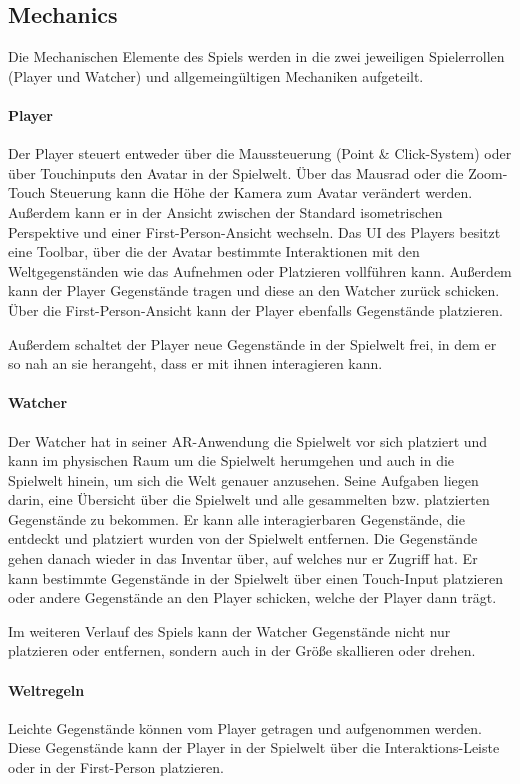 \subsection{Mechanics}
Die Mechanischen Elemente des Spiels werden in die zwei jeweiligen Spielerrollen (Player und Watcher) und allgemeingültigen Mechaniken aufgeteilt.

\paragraph{Player}
Der Player steuert entweder über die Maussteuerung (Point \& Click-System) oder über Touchinputs den Avatar in der Spielwelt. Über das Mausrad oder die Zoom-Touch Steuerung kann die Höhe der Kamera zum Avatar verändert werden. Außerdem kann er in der Ansicht zwischen der Standard isometrischen Perspektive und einer First-Person-Ansicht wechseln. Das \ac{UI} des Players besitzt eine Toolbar, über die der Avatar bestimmte Interaktionen mit den Weltgegenständen wie das Aufnehmen oder Platzieren vollführen kann. Außerdem kann der Player Gegenstände tragen und diese an den Watcher zurück schicken. Über die First-Person-Ansicht kann der Player ebenfalls Gegenstände platzieren.

Außerdem schaltet der Player neue Gegenstände in der Spielwelt frei, in dem er so nah an sie herangeht, dass er mit ihnen interagieren kann.

\paragraph{Watcher}
Der Watcher hat in seiner \ac{AR}-Anwendung die Spielwelt vor sich platziert und kann im physischen Raum um die Spielwelt herumgehen und auch in die Spielwelt hinein, um sich die Welt genauer anzusehen. Seine Aufgaben liegen darin, eine Übersicht über die Spielwelt und alle gesammelten bzw. platzierten Gegenstände zu bekommen. Er kann alle interagierbaren Gegenstände, die entdeckt und platziert wurden von der Spielwelt entfernen. Die Gegenstände gehen danach wieder in das Inventar über, auf welches nur er Zugriff hat. Er kann bestimmte Gegenstände in der Spielwelt über einen Touch-Input platzieren oder andere Gegenstände an den Player schicken, welche der Player dann trägt. 

Im weiteren Verlauf des Spiels kann der Watcher Gegenstände nicht nur platzieren oder entfernen, sondern auch in der Größe skallieren oder drehen.

\paragraph{Weltregeln}
Leichte Gegenstände können vom Player getragen und aufgenommen werden. Diese Gegenstände kann der Player in der Spielwelt über die Interaktions-Leiste oder in der First-Person platzieren. 

